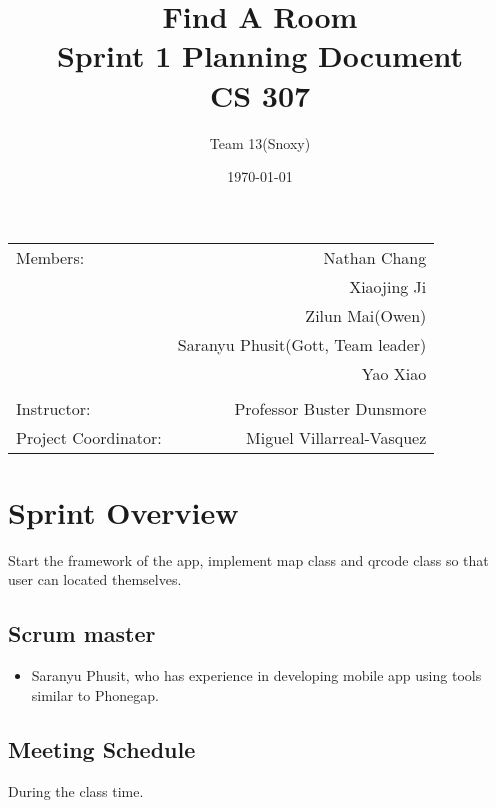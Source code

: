 \documentclass[12pt]{article}
\title{\textbf{Find A Room} \\ Sprint 1 Planning Document \\ CS 307} %
\author{Team \textsc{13}(Snoxy)} %
\date{\today} %
\begin{document}
\maketitle %

\begin{center}
\begin{tabular}{l r}
Members: & Nathan Chang \\ %
& Xiaojing Ji \\
& Zilun Mai(Owen) \\
& Saranyu Phusit(Gott, Team leader) \\
& Yao Xiao \\
\\
\bigskip
Instructor: & Professor Buster Dunsmore \\%
Project Coordinator: & Miguel Villarreal-Vasquez %

\end{tabular}
\end{center}




\newpage

\section{Sprint Overview}

Start the framework of the app, implement map class and qrcode class so that user can located themselves.


\subsection{Scrum master}
\begin{itemize}
\item Saranyu Phusit, who has experience in developing mobile app using tools similar to Phonegap.
\end{itemize}
\subsection{Meeting Schedule}
During the class time.
\end{document}
